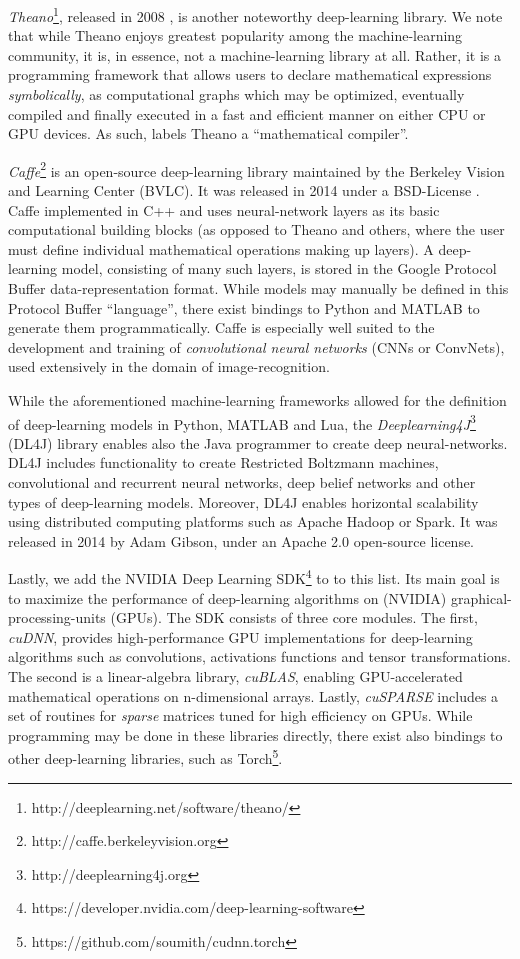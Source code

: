 \emph{Theano}\footnote{http://deeplearning.net/software/theano/}, released in
2008 \cite{theano}, is another noteworthy deep-learning library. We note that
while Theano enjoys greatest popularity among the machine-learning community, it
is, in essence, not a machine-learning library at all. Rather, it is a
programming framework that allows users to declare mathematical expressions
\emph{symbolically}, as computational graphs which may be optimized, eventually
compiled and finally executed in a fast and efficient manner on either CPU or
GPU devices. As such, \cite{theano} labels Theano a ``mathematical compiler''.

\emph{Caffe}\footnote{http://caffe.berkeleyvision.org} is an open-source
deep-learning library maintained by the Berkeley Vision and Learning Center
(BVLC). It was released in 2014 under a BSD-License \cite{caffe}. Caffe
implemented in C++ and uses neural-network layers as its basic computational
building blocks (as opposed to Theano and others, where the user must define
individual mathematical operations making up layers). A deep-learning model,
consisting of many such layers, is stored in the Google Protocol Buffer
data-representation format. While models may manually be defined in this
Protocol Buffer ``language'', there exist bindings to Python and MATLAB to
generate them programmatically. Caffe is especially well suited to the
development and training of \emph{convolutional neural networks} (CNNs or
ConvNets), used extensively in the domain of image-recognition.

While the aforementioned machine-learning frameworks allowed for the definition
of deep-learning models in Python, MATLAB and Lua, the
\emph{Deeplearning4J}\footnote{http://deeplearning4j.org} (DL4J) library enables
also the Java programmer to create deep neural-networks. DL4J includes
functionality to create Restricted Boltzmann machines, convolutional and
recurrent neural networks, deep belief networks and other types of deep-learning
models. Moreover, DL4J enables horizontal scalability using distributed
computing platforms such as Apache Hadoop or Spark. It was released in 2014 by
Adam Gibson, under an Apache 2.0 open-source license.

Lastly, we add the NVIDIA Deep Learning
SDK\footnote{https://developer.nvidia.com/deep-learning-software} to to this
list. Its main goal is to maximize the performance of deep-learning algorithms on
(NVIDIA) graphical-processing-units (GPUs). The SDK consists of three core
modules. The first, \emph{cuDNN}, provides high-performance GPU implementations
for deep-learning algorithms such as convolutions, activations functions and
tensor transformations. The second is a linear-algebra library, \emph{cuBLAS},
enabling GPU-accelerated mathematical operations on n-dimensional
arrays. Lastly, \emph{cuSPARSE} includes a set of routines for \emph{sparse}
matrices tuned for high efficiency on GPUs. While programming may be done in
these libraries directly, there exist also bindings to other deep-learning
libraries, such as Torch\footnote{https://github.com/soumith/cudnn.torch}.

